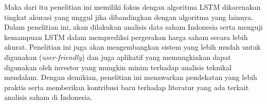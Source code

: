 Maka dari itu penelitian ini memiliki fokus dengan algoritma LSTM dikarenakan tingkat akurasi yang unggul jika dibandingkan dengan algoritma yang lainnya. Dalam penelitian ini, akan dilakukan analisis data saham Indonesia serta menguji kemampuan LSTM dalam memprediksi pergerakan harga saham secara lebih akurat. Penelitian ini juga akan mengembangkan sistem yang lebih mudah untuk digunakan (\textit{user-friendly}) dan juga aplikatif yang memungkinkan dapat digunakan oleh investor yang mungkin minim terhadap analisis teknikal mendalam. Dengan demikian, penelitian ini menawarkan pendekatan yang lebih praktis serta memberikan kontribusi baru terhadap literatur yang ada terkait analisis saham di Indonesia.
